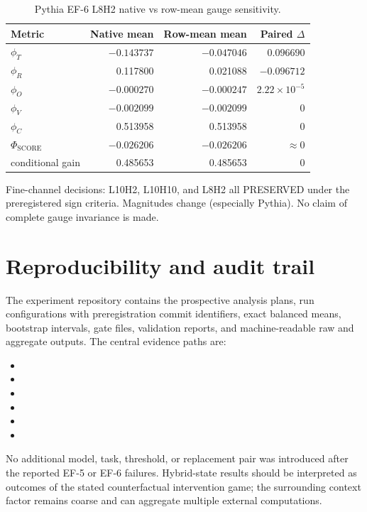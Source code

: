 \documentclass[preprint,12pt,authoryear]{elsarticle}
\begin{document}
\begin{table}[h]
\centering
\caption{Pythia EF-6 L8H2 native vs row-mean gauge sensitivity.}
\begin{tabular}{lrrr}
\toprule
Metric & Native mean & Row-mean mean & Paired $\Delta$ \\
\midrule
$\phi_T$ & $-0.143737$ & $-0.047046$ & $0.096690$ \\
$\phi_R$ & 0.117800 & 0.021088 & $-0.096712$ \\
$\phi_O$ & $-0.000270$ & $-0.000247$ & $2.22\times10^{-5}$ \\
$\phi_V$ & $-0.002099$ & $-0.002099$ & $0$ \\
$\phi_C$ & 0.513958 & 0.513958 & $0$ \\
$\Phi_{\mathrm{SCORE}}$ & $-0.026206$ & $-0.026206$ & $\approx0$ \\
conditional gain & 0.485653 & 0.485653 & $0$ \\
\bottomrule
\end{tabular}
\end{table}

Fine-channel decisions: L10H2, L10H10, and L8H2 all PRESERVED under the
preregistered sign criteria. Magnitudes change (especially Pythia). No claim of
complete gauge invariance is made.

\section{Reproducibility and audit trail}

The experiment repository contains the prospective analysis plans, run
configurations with preregistration commit identifiers, exact balanced means,
bootstrap intervals, gate files, validation reports, and machine-readable raw and
aggregate outputs. The central evidence paths are:

\begin{itemize}
\item {}
\item {}
\item {}
\item {}
\item {}
\item {}
\end{itemize}

No additional model, task, threshold, or replacement pair was introduced after the
reported EF-5 or EF-6 failures. Hybrid-state results should be interpreted as outcomes
of the stated counterfactual intervention game; the surrounding context factor remains
coarse and can aggregate multiple external computations.
\end{document}
